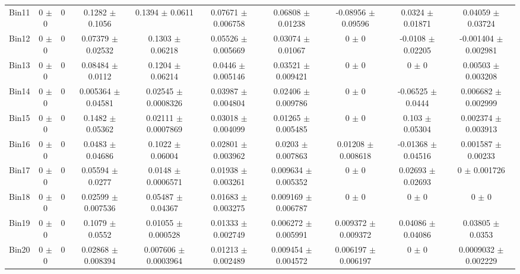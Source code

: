 \begin{tabular}{@{\extracolsep{4pt}}lccccccccc@{}}
     Bin11 & 0 $\pm$ 0 & 0 & 0.1282 $\pm$ 0.1056 & 0.1394 $\pm$ 0.0611 & 0.07671 $\pm$ 0.006758 & 0.06808 $\pm$ 0.01238 & -0.08956 $\pm$ 0.09596 & 0.0324 $\pm$ 0.01871 & 0.04059 $\pm$ 0.03724 \\ 
     Bin12 & 0 $\pm$ 0 & 0 & 0.07379 $\pm$ 0.02532 & 0.1303 $\pm$ 0.06218 & 0.05526 $\pm$ 0.005669 & 0.03074 $\pm$ 0.01067 & 0 $\pm$ 0 & -0.0108 $\pm$ 0.02205 & -0.001404 $\pm$ 0.002981 \\ 
     Bin13 & 0 $\pm$ 0 & 0 & 0.08484 $\pm$ 0.0112 & 0.1204 $\pm$ 0.06214 & 0.0446 $\pm$ 0.005146 & 0.03521 $\pm$ 0.009421 & 0 $\pm$ 0 & 0 $\pm$ 0 & 0.00503 $\pm$ 0.003208 \\ 
     Bin14 & 0 $\pm$ 0 & 0 & 0.005364 $\pm$ 0.04581 & 0.02545 $\pm$ 0.0008326 & 0.03987 $\pm$ 0.004804 & 0.02406 $\pm$ 0.009786 & 0 $\pm$ 0 & -0.06525 $\pm$ 0.0444 & 0.006682 $\pm$ 0.002999 \\ 
     Bin15 & 0 $\pm$ 0 & 0 & 0.1482 $\pm$ 0.05362 & 0.02111 $\pm$ 0.0007869 & 0.03018 $\pm$ 0.004099 & 0.01265 $\pm$ 0.005485 & 0 $\pm$ 0 & 0.103 $\pm$ 0.05304 & 0.002374 $\pm$ 0.003913 \\ 
     Bin16 & 0 $\pm$ 0 & 0 & 0.0483 $\pm$ 0.04686 & 0.1022 $\pm$ 0.06004 & 0.02801 $\pm$ 0.003962 & 0.0203 $\pm$ 0.007863 & 0.01208 $\pm$ 0.008618 & -0.01368 $\pm$ 0.04516 & 0.001587 $\pm$ 0.00233 \\ 
     Bin17 & 0 $\pm$ 0 & 0 & 0.05594 $\pm$ 0.0277 & 0.0148 $\pm$ 0.0006571 & 0.01938 $\pm$ 0.003261 & 0.009634 $\pm$ 0.005352 & 0 $\pm$ 0 & 0.02693 $\pm$ 0.02693 & 0 $\pm$ 0.001726 \\ 
     Bin18 & 0 $\pm$ 0 & 0 & 0.02599 $\pm$ 0.007536 & 0.05487 $\pm$ 0.04367 & 0.01683 $\pm$ 0.003275 & 0.009169 $\pm$ 0.006787 & 0 $\pm$ 0 & 0 $\pm$ 0 & 0 $\pm$ 0 \\ 
     Bin19 & 0 $\pm$ 0 & 0 & 0.1079 $\pm$ 0.0552 & 0.01055 $\pm$ 0.000528 & 0.01333 $\pm$ 0.002749 & 0.006272 $\pm$ 0.005991 & 0.009372 $\pm$ 0.009372 & 0.04086 $\pm$ 0.04086 & 0.03805 $\pm$ 0.0353 \\ 
     Bin20 & 0 $\pm$ 0 & 0 & 0.02868 $\pm$ 0.008394 & 0.007606 $\pm$ 0.0003964 & 0.01213 $\pm$ 0.002489 & 0.009454 $\pm$ 0.004572 & 0.006197 $\pm$ 0.006197 & 0 $\pm$ 0 & 0.0009032 $\pm$ 0.002229 \\ 
\hline\hline
  \end{tabular}
